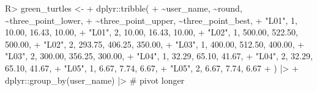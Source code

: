 \documentclass[
  11pt,
  a4paper,
]{article}
\newenvironment{Shaded}{\begin{snugshade}}{\end{snugshade}}
\newcommand{\CommentTok}[1]{\textcolor[rgb]{0.37,0.37,0.37}{#1}}
\newcommand{\DecValTok}[1]{\textcolor[rgb]{0.68,0.00,0.00}{#1}}
\newcommand{\ErrorTok}[1]{\textcolor[rgb]{0.68,0.00,0.00}{#1}}
\newcommand{\FloatTok}[1]{\textcolor[rgb]{0.68,0.00,0.00}{#1}}
\newcommand{\FunctionTok}[1]{\textcolor[rgb]{0.28,0.35,0.67}{#1}}
\newcommand{\NormalTok}[1]{\textcolor[rgb]{0.00,0.23,0.31}{#1}}
\newcommand{\OtherTok}[1]{\textcolor[rgb]{0.00,0.23,0.31}{#1}}
\newcommand{\SpecialCharTok}[1]{\textcolor[rgb]{0.37,0.37,0.37}{#1}}
\newcommand{\StringTok}[1]{\textcolor[rgb]{0.13,0.47,0.30}{#1}}
\begin{document}
\begin{Shaded}
\begin{Highlighting}[]
\NormalTok{R}\SpecialCharTok{\textgreater{}}\NormalTok{ green\_turtles }\OtherTok{\textless{}{-}}
\SpecialCharTok{+}\NormalTok{    dplyr}\SpecialCharTok{::}\FunctionTok{tribble}\NormalTok{(}
\SpecialCharTok{+}      \ErrorTok{\textasciitilde{}}\NormalTok{user\_name, }\SpecialCharTok{\textasciitilde{}}\NormalTok{round, }\SpecialCharTok{\textasciitilde{}}\NormalTok{three\_point\_lower,}
\SpecialCharTok{+}      \ErrorTok{\textasciitilde{}}\NormalTok{three\_point\_upper, }\SpecialCharTok{\textasciitilde{}}\NormalTok{three\_point\_best,}
\SpecialCharTok{+}      \StringTok{"L01"}\NormalTok{, }\DecValTok{1}\NormalTok{, }\FloatTok{10.00}\NormalTok{, }\FloatTok{16.43}\NormalTok{, }\FloatTok{10.00}\NormalTok{,}
\SpecialCharTok{+}      \StringTok{"L01"}\NormalTok{, }\DecValTok{2}\NormalTok{, }\FloatTok{10.00}\NormalTok{, }\FloatTok{16.43}\NormalTok{, }\FloatTok{10.00}\NormalTok{,}
\SpecialCharTok{+}      \StringTok{"L02"}\NormalTok{, }\DecValTok{1}\NormalTok{, }\FloatTok{500.00}\NormalTok{, }\FloatTok{522.50}\NormalTok{, }\FloatTok{500.00}\NormalTok{,}
\SpecialCharTok{+}      \StringTok{"L02"}\NormalTok{, }\DecValTok{2}\NormalTok{, }\FloatTok{293.75}\NormalTok{, }\FloatTok{406.25}\NormalTok{, }\FloatTok{350.00}\NormalTok{,}
\SpecialCharTok{+}      \StringTok{"L03"}\NormalTok{, }\DecValTok{1}\NormalTok{, }\FloatTok{400.00}\NormalTok{, }\FloatTok{512.50}\NormalTok{, }\FloatTok{400.00}\NormalTok{,}
\SpecialCharTok{+}      \StringTok{"L03"}\NormalTok{, }\DecValTok{2}\NormalTok{, }\FloatTok{300.00}\NormalTok{, }\FloatTok{356.25}\NormalTok{, }\FloatTok{300.00}\NormalTok{,}
\SpecialCharTok{+}      \StringTok{"L04"}\NormalTok{, }\DecValTok{1}\NormalTok{, }\FloatTok{32.29}\NormalTok{, }\FloatTok{65.10}\NormalTok{, }\FloatTok{41.67}\NormalTok{,}
\SpecialCharTok{+}      \StringTok{"L04"}\NormalTok{, }\DecValTok{2}\NormalTok{, }\FloatTok{32.29}\NormalTok{, }\FloatTok{65.10}\NormalTok{, }\FloatTok{41.67}\NormalTok{,}
\SpecialCharTok{+}      \StringTok{"L05"}\NormalTok{, }\DecValTok{1}\NormalTok{, }\FloatTok{6.67}\NormalTok{, }\FloatTok{7.74}\NormalTok{, }\FloatTok{6.67}\NormalTok{,}
\SpecialCharTok{+}      \StringTok{"L05"}\NormalTok{, }\DecValTok{2}\NormalTok{, }\FloatTok{6.67}\NormalTok{, }\FloatTok{7.74}\NormalTok{, }\FloatTok{6.67}
\SpecialCharTok{+}\NormalTok{    ) }\SpecialCharTok{|\textgreater{}}
\SpecialCharTok{+}\NormalTok{    dplyr}\SpecialCharTok{::}\FunctionTok{group\_by}\NormalTok{(user\_name) }\SpecialCharTok{|\textgreater{}} \CommentTok{\# pivot longer}

\end{Highlighting}
\end{Shaded}
\end{document}
